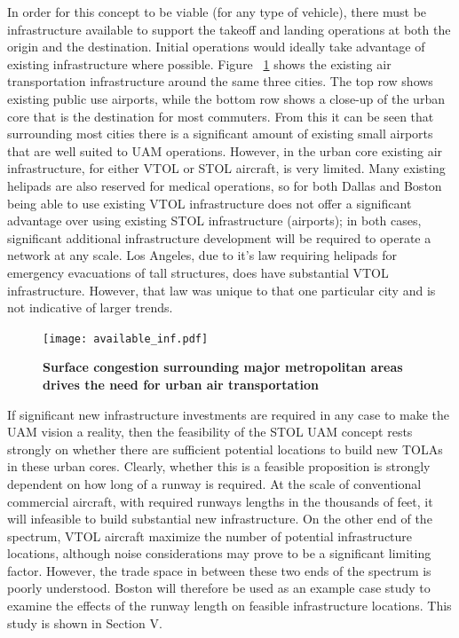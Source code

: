 \documentclass[]{aiaa-tc}%
\begin{document}
In order for this concept to be viable (for any type of vehicle), there must be infrastructure available to support the takeoff and landing operations at both the origin and the destination.  Initial operations would ideally take advantage of existing infrastructure where possible. Figure ~\ref{f:inf_avail} shows the existing air transportation infrastructure around the same three cities.  The top row shows existing public use airports, while the bottom row shows a close-up of the urban core that is the destination for most commuters.  From this it can be seen that surrounding most cities there is a significant amount of existing small airports that are well suited to UAM operations.  However, in the urban core existing air infrastructure, for either VTOL or STOL aircraft, is very limited.  Many existing helipads are also reserved for medical operations, so for both Dallas and Boston being able to use existing VTOL infrastructure does not offer a significant advantage over using existing STOL infrastructure (airports); in both cases, significant additional infrastructure development will be required to operate a network at any scale.  Los Angeles, due to it's law requiring helipads for emergency evacuations of tall structures, does have substantial VTOL infrastructure.   However, that law was unique to that one particular city and is not indicative of larger trends.~\cite{Vascik2017} 

\begin{figure}[h!]
	\begin{center}
	\texttt{[image: available\_inf.pdf]}
    \caption{\textbf{Surface congestion surrounding major metropolitan areas drives the need for urban air transportation}}
	\label{f:inf_avail}
	\end{center}
\end{figure}

If significant new infrastructure investments are required in any case to make the UAM vision a reality, then the feasibility of the STOL UAM concept rests strongly on whether there are sufficient potential locations to build new TOLAs in these urban cores.  Clearly, whether this is a feasible proposition is strongly dependent on how long of a runway is required.  At the scale of conventional commercial aircraft, with required runways lengths in the thousands of feet, it will infeasible to build substantial new infrastructure.  On the other end of the spectrum, VTOL aircraft maximize the number of potential infrastructure locations, although noise considerations may prove to be a significant limiting factor.  However, the trade space in between these two ends of the spectrum is poorly understood. Boston will therefore be used as an example case study to examine the effects of the runway length on feasible infrastructure locations.  This study is shown in Section V.   
\end{document}
